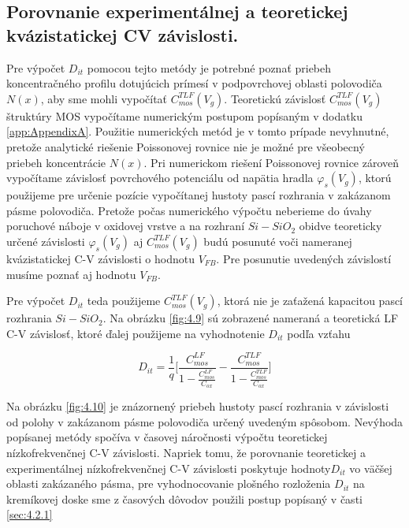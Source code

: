 \subsection{Porovnanie experimentálnej a teoretickej kvázistatickej CV závislosti.}\label{sec:4.2.2}

Pre výpočet $D_{it}$ pomocou tejto metódy je potrebné poznať priebeh
koncentračného profilu dotujúcich prímesí v podpovrchovej oblasti
polovodiča $N(x)$, aby sme mohli vypočítať
$C_{mos}^{TLF}(V_{g})$. Teoretickú závislosť $C_{mos}^{TLF}(V_{g})$
štruktúry MOS vypočítame numerickým postupom popísaným v dodatku
\ref{app:AppendixA}.  Použitie numerických metód je v tomto prípade
nevyhnutné, pretože analytické riešenie Poissonovej rovnice nie je
možné pre všeobecný priebeh koncentrácie $N(x)$.  Pri numerickom
riešení Poissonovej rovnice zároveň vypočítame závislosť povrchového
potenciálu od napätia hradla $\varphi_{s}(V_{g})$, ktorú použijeme pre
určenie pozície vypočítanej hustoty pascí rozhrania v zakázanom pásme
polovodiča.  Pretože počas numerického výpočtu neberieme do úvahy
poruchové náboje v oxidovej vrstve a na rozhraní $Si-SiO_{2}$ obidve
teoreticky určené závislosti $\varphi_{s}(V_{g})$ aj
$C_{mos}^{TLF}(V_{g})$ budú posunuté voči nameranej kvázistatickej C-V
závislosti o hodnotu $V_{FB}$. Pre posunutie uvedených závislostí
musíme poznať aj hodnotu $V_{FB}$.

\par Pre výpočet $D_{it}$ teda použijeme $C_{mos}^{TLF}(V_{g})$, ktorá
nie je zaťažená kapacitou pascí rozhrania $Si-SiO_{2}$. Na obrázku
\ref{fig:4.9} sú zobrazené nameraná a teoretická LF C-V závislosť,
ktoré ďalej použijeme na vyhodnotenie $D_{it}$ podľa vzťahu

\begin{equation}\label{eq:4.18}
D_{it} = \frac{1}{q} \Bigg[\frac{C_{mos}^{LF}}{1-\frac{C_{mos}^{LF}}{C_{ox}}} - \frac{C_{mos}^{TLF}}{1-\frac{C_{mos}^{TLF}}{C_{ox}}}\Bigg]
\end{equation}

Na obrázku \ref{fig:4.10} je znázornený priebeh hustoty pascí
rozhrania v závislosti od polohy v zakázanom pásme polovodiča určený
uvedeným spôsobom.  Nevýhoda popísanej metódy spočíva v časovej
náročnosti výpočtu teoretickej nízkofrekvenčnej C-V
závislosti. Napriek tomu, že porovnanie teoretickej a experimentálnej
nízkofrekvenčnej C-V závislosti poskytuje hodnoty$D_{it}$ vo väčšej
oblasti zakázaného pásma, pre vyhodnocovanie plošného rozloženia
$D_{it}$ na kremíkovej doske sme z časových dôvodov použili postup
popísaný v časti \ref{sec:4.2.1}

